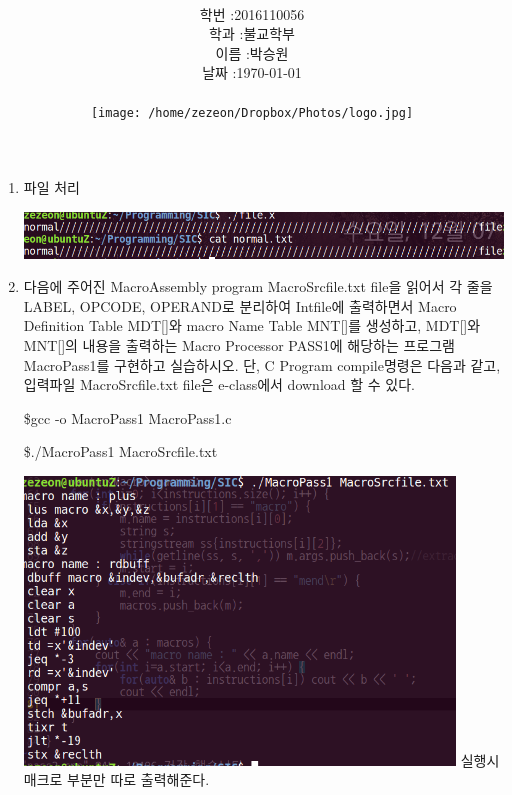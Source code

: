 \documentclass[12pt,a4paper]{article}
\title{
	\centering
	\pgfornament[width=12cm,color=teal]{84}\\
	\vspace{1cm}
	\fontsize{50}{50} \selectfont {시스템 S/W 실습11}\\
	\pgfornament[width=12cm,color=teal]{88}\\
	\vfill}
\author{
	\LARGE
	\begin{tabular}{rl}
		\hline
		학번 : & 2016110056\\ 
		학과 : & 불교학부 \\
		이름 : & 박승원\\
		날짜 : & \today\\
		\hline
	\end{tabular}\vspace{2cm}
	\\
	\texttt{[image: /home/zezeon/Dropbox/Photos/logo.jpg]}
}
\date{}
\begin{document}
\maketitle
\newpage
\noindent
\lstset{columns=flexible, tabsize=4, frame=single, showstringspaces=false, breaklines=true, upquote=true}

\lstset{language=C}
\begin{enumerate}
\item 파일 처리



\includegraphics[width=\textwidth]{1.png}

\item 다음에 주어진 MacroAssembly program MacroSrcfile.txt file을 읽어서 각 줄을 LABEL, OPCODE, OPERAND로 분리하여 Intfile에 출력하면서 Macro Definition Table MDT[]와 macro Name Table MNT[]를 생성하고, MDT[]와 MNT[]의 내용을 출력하는 Macro Processor PASS1에 해당하는 프로그램 MacroPass1를 구현하고 실습하시오.
단, C Program compile명령은 다음과 같고, 입력파일 MacroSrcfile.txt file은 e-class에서 download 할 수 있다.

\$gcc -o MacroPass1 MacroPass1.c

\$./MacroPass1 MacroSrcfile.txt



\includegraphics[width=0.9\textwidth]{2.png}
실행시 매크로 부분만 따로 출력해준다.


\end{enumerate}
\end{document}
